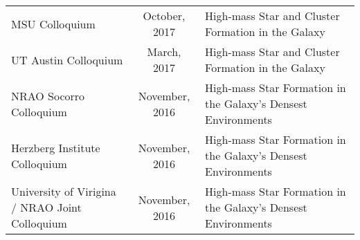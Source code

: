 \begin{minipage}{\textwidth}
\begin{tabular}{p{1.8in}cp{3.5in}}
    MSU Colloquium & October, 2017 & High-mass Star and Cluster Formation in the Galaxy \\
    UT Austin Colloquium & March, 2017 & High-mass Star and Cluster Formation in the Galaxy \\
    NRAO Socorro Colloquium & November, 2016 & High-mass Star Formation in the Galaxy's Densest Environments \\
    Herzberg Institute Colloquium & November, 2016 & High-mass Star Formation in the Galaxy's Densest Environments \\
    University of Virigina / NRAO Joint Colloquium & November, 2016 & High-mass Star Formation in the Galaxy's Densest Environments \\
\end{tabular}
\end{minipage}
\vspace{4mm}
